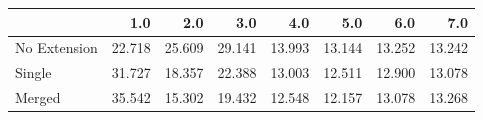 \begin{tabular}{lrrrrrrr}
\toprule
{} &    1.0 &    2.0 &    3.0 &    4.0 &    5.0 &    6.0 &    7.0 \\
\midrule
No Extension & 22.718 & 25.609 & 29.141 & 13.993 & 13.144 & 13.252 & 13.242 \\
Single       & 31.727 & 18.357 & 22.388 & 13.003 & 12.511 & 12.900 & 13.078 \\
Merged       & 35.542 & 15.302 & 19.432 & 12.548 & 12.157 & 13.078 & 13.268 \\
\bottomrule
\end{tabular}
